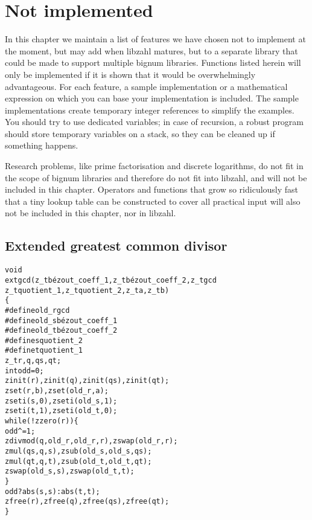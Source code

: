 \chapter{Not implemented}
\label{chap:Not implemented}

In this chapter we maintain a list of
features we have chosen not to implement at
the moment, but may add when libzahl matures,
but to a separate library that could be made
to support multiple bignum libraries. Functions
listed herein will only be implemented if it
is shown that it would be overwhelmingly
advantageous. For each feature, a sample
implementation or a mathematical expression
on which you can base your implementation is
included. The sample implementations create
temporary integer references to simplify the
examples. You should try to use dedicated
variables; in case of recursion, a robust
program should store temporary variables on
a stack, so they can be cleaned up if
something happens.

Research problems, like prime factorisation
and discrete logarithms, do not fit in the
scope of bignum libraries %
and therefore do not fit into libzahl,
and will not be included in this chapter.
Operators and functions that grow so
ridiculously fast that a tiny lookup table
can be constructed to cover all practical
input will also not be included in this
chapter, nor in libzahl.

\vspace{1cm}
\minitoc


\newpage
\section{Extended greatest common divisor}
\label{sec:Extended greatest common divisor}

\begin{alltt}
void
extgcd(z_t bézout_coeff_1, z_t bézout_coeff_2, z_t gcd
       z_t quotient_1, z_t quotient_2, z_t a, z_t b)
\{
#define old_r gcd
#define old_s bézout_coeff_1
#define old_t bézout_coeff_2
#define s quotient_2
#define t quotient_1
    z_t r, q, qs, qt;
    int odd = 0;
    zinit(r), zinit(q), zinit(qs), zinit(qt);
    zset(r, b), zset(old_r, a);
    zseti(s, 0), zseti(old_s, 1);
    zseti(t, 1), zseti(old_t, 0);
    while (!zzero(r)) \{
        odd ^= 1;
        zdivmod(q, old_r, old_r, r), zswap(old_r, r);
        zmul(qs, q, s), zsub(old_s, old_s, qs);
        zmul(qt, q, t), zsub(old_t, old_t, qt);
        zswap(old_s, s), zswap(old_t, t);
    \}
    odd ? abs(s, s) : abs(t, t);
    zfree(r), zfree(q), zfree(qs), zfree(qt);
\}
\end{alltt}


